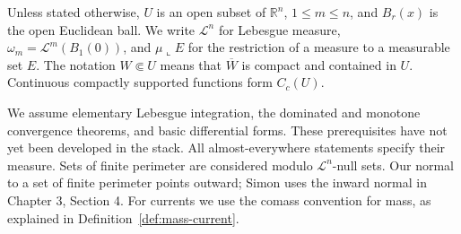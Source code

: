 \begin{remark}\label{rem:notation}
Unless stated otherwise, $U$ is an open subset of $\mathbb{R}^n$, $1\leq m\leq n$, and $B_r(x)$ is the open Euclidean ball. We write $\mathcal{L}^n$ for Lebesgue measure, $\omega_m=\mathcal{L}^m(B_1(0))$, and $\mu\llcorner E$ for the restriction of a measure to a measurable set $E$. The notation $W\Subset U$ means that $\overline W$ is compact and contained in $U$. Continuous compactly supported functions form $C_c(U)$.

We assume elementary Lebesgue integration, the dominated and monotone convergence theorems, and basic differential forms. These prerequisites have not yet been developed in the stack. All almost-everywhere statements specify their measure. Sets of finite perimeter are considered modulo $\mathcal{L}^n$-null sets. Our normal to a set of finite perimeter points outward; Simon uses the inward normal in Chapter 3, Section 4. For currents we use the comass convention for mass, as explained in Definition~\ref{def:mass-current}.
\end{remark}

